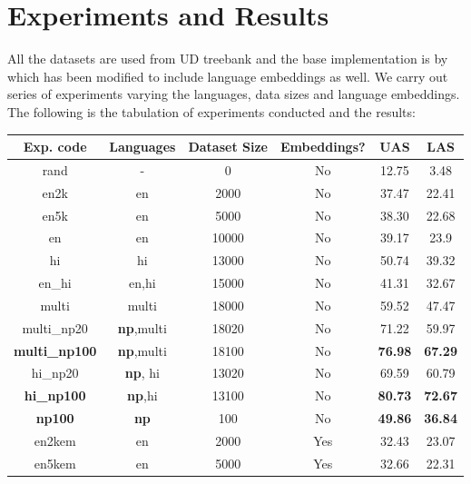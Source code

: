 \section{Experiments and Results}
All the datasets are used from UD treebank and the base implementation is by
\cite{steps-parser} which has been modified to include language embeddings as
well. We carry out series of experiments varying the languages, data sizes and language embeddings.
The following is the tabulation of experiments conducted and the results:
\begin{table}[ht]
    \begin{center}
        \begin{tabular}{|c|c|c|c|c|c|}
            \hline
            \textbf{Exp. code} & \textbf{Languages} & \textbf{Dataset Size} & \textbf{Embeddings?} & \textbf{UAS} & \textbf{LAS} \\
            \hline
            rand & - & 0 & No & 12.75 & 3.48 \\
            \hline
            en2k & en & 2000 & No & 37.47 & 22.41 \\
            \hline
            en5k & en & 5000 & No & 38.30 & 22.68 \\
            \hline
            en & en & 10000 & No & 39.17 & 23.9 \\
            \hline
            hi & hi & 13000 & No & 50.74 & 39.32 \\
            \hline
            en\_hi & en,hi & 15000 & No & 41.31 & 32.67 \\
            \hline
            multi & multi & 18000 & No & 59.52 & 47.47 \\
            \hline
            multi\_np20 & \textbf{np},multi & 18020 & No & 71.22 & 59.97 \\
            \hline
            \textbf{multi\_np100} & \textbf{np},multi & 18100 & No & \textbf{76.98} & \textbf{67.29} \\
            \hline
            hi\_np20 & \textbf{np}, hi & 13020 & No & 69.59 & 60.79 \\
            \hline
            \textbf{hi\_np100} & \textbf{np},hi & 13100 & No & \textbf{80.73} & \textbf{72.67} \\
            \hline
            \textbf{np100} & \textbf{np} & 100 & No & \textbf{49.86} & \textbf{36.84} \\
            \hline
            \hline
            en2kem & en & 2000 & Yes & 32.43 & 23.07 \\
            \hline
            en5kem & en & 5000 & Yes & 32.66 & 22.31 \\

\end{tabular}
\end{center}
\end{table}
